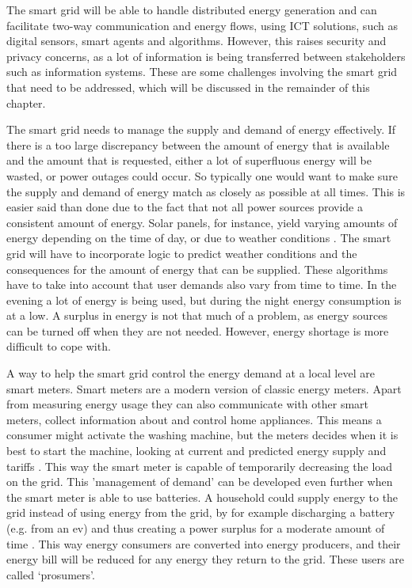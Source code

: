 The smart grid will be able to handle distributed energy generation and can facilitate two-way communication and energy flows, using ICT solutions, such as digital sensors, smart agents and algorithms. However, this raises security and privacy concerns, as a lot of information is being transferred between stakeholders such as information systems. These are some challenges involving the smart grid that need to be addressed, which will be discussed in the remainder of this chapter.

The smart grid needs to manage the supply and demand of energy effectively. If there is a too large discrepancy between the amount of energy that is available and the amount that is requested, either a lot of superfluous energy will be wasted, or power outages could occur. So typically one would want to make sure the supply and demand of energy match as closely as possible at all times. This is easier said than done due to the fact that not all power sources provide a consistent amount of energy. Solar panels, for instance, yield varying amounts of energy depending on the time of day, or due to weather conditions \cite{RamchurnVitelingumRogersJennings2014}. The smart grid will have to incorporate logic to predict weather conditions and the consequences for the amount of energy that can be supplied. These algorithms have to take into account that user demands also vary from time to time. In the evening a lot of energy is being used, but during the night energy consumption is at a low. A surplus in energy is not that much of a problem, as energy sources can be turned off when they are not needed. However, energy shortage is more difficult to cope with.

A way to help the smart grid control the energy demand at a local level are smart meters. Smart meters are a modern version of classic energy meters. Apart from measuring energy usage they can also communicate with other smart meters, collect information about and control home appliances. This means a consumer might activate the washing machine, but the meters decides when it is best to start the machine, looking at current and predicted energy supply and tariffs  \cite{DepuruWangDevabhaktuni2011a}. This way the smart meter is capable of temporarily decreasing the load on the grid. This 'management of demand' can be developed even further when the smart meter is able to use batteries. A household could supply energy to the grid instead of using energy from the grid, by for example discharging a battery (e.g. from an \ac{ev}) and thus creating a power surplus for a moderate amount of time \cite{MwasiluJustoKimEtAl2014}. This way energy consumers are converted into energy producers, and their energy bill will be reduced for any energy they return to the grid. These users are called `prosumers'.

